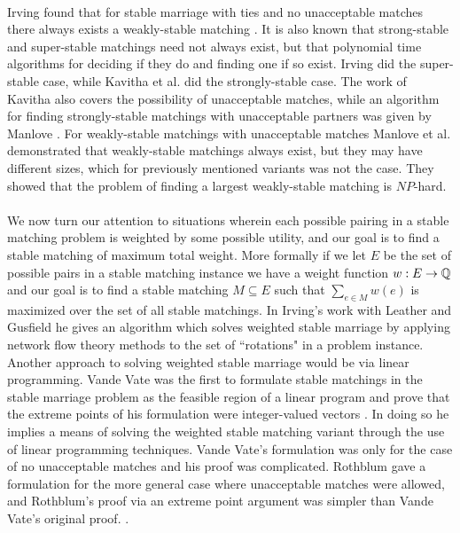\paragraph{}
Irving found that for stable marriage with ties and no unacceptable matches there always exists a weakly-stable matching \cite{irving1994stable}. It is also known that strong-stable and super-stable matchings need not always exist, but that polynomial time algorithms for deciding if they do and finding one if so exist. Irving did the super-stable case, while Kavitha et al. \cite{kavitha2004strongly} did the strongly-stable case. The work of Kavitha also covers the possibility of unacceptable matches, while an algorithm for finding strongly-stable matchings with unacceptable partners was given by Manlove \cite{manlove1999stable}. For weakly-stable matchings with unacceptable matches Manlove et al. \cite{manlove2002hard} demonstrated that weakly-stable matchings always exist, but they may have different sizes, which for previously mentioned variants was not the case. They showed that the problem of finding a largest weakly-stable matching is $NP$-hard.
\paragraph{}
We now turn our attention to situations wherein each possible pairing in a stable matching problem is weighted by some possible utility, and our goal is to find a stable matching of maximum total weight. More formally if we let $E$ be the set of possible pairs in a stable matching instance we have a weight function $w : E \rightarrow \mathbb{Q}$ and our goal is to find a stable matching $M \subseteq E$ such that $\sum_{e\in M} w(e)$ is maximized over the set of all stable matchings. In Irving's work with Leather and Gusfield \cite{irving1987efficient} he gives an algorithm which solves weighted stable marriage by applying network flow theory methods to the set of ``rotations" in a problem instance. Another approach to solving weighted stable marriage would be via linear programming. Vande Vate was the first to formulate stable matchings in the stable marriage problem as the feasible region of a linear program and prove that the extreme points of his formulation were integer-valued vectors \cite{vate1989linear}. In doing so he implies a means of solving the weighted stable matching variant through the use of linear programming techniques. Vande Vate's formulation was only for the case of no unacceptable matches and his proof was complicated. Rothblum gave a formulation for the more general case where unacceptable matches were allowed, and Rothblum's proof via an extreme point argument was simpler than Vande Vate's original proof. \cite{rothblum1992characterization}.
